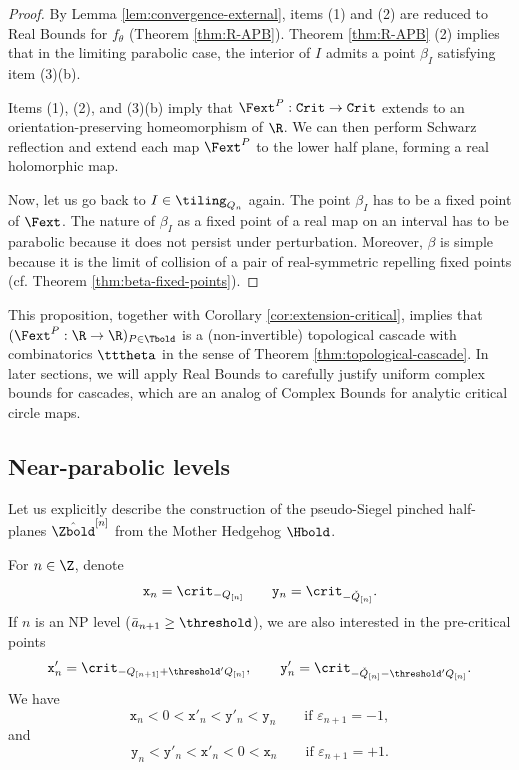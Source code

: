 \documentclass{amsart}
\begin{document}
\begin{proof}
    By Lemma \ref{lem:convergence-external}, items (1) and (2) are reduced to Real Bounds for $f_\theta$ (Theorem \ref{thm:R-APB}).
    Theorem \ref{thm:R-APB} (2) implies that in the limiting parabolic case, the interior of $I$ admits a point $\beta_I$ satisfying item (3)(b).
    
    Items (1), (2), and (3)(b) imply that $\Fext^{P}: \mathtt{Crit} \to \mathtt{Crit}$ extends to an orientation-preserving homeomorphism of $\R$. 
    We can then perform Schwarz reflection and extend each map $\Fext^P$ to the lower half plane, forming a real holomorphic map.
    
    Now, let us go back to $I \in \tiling_{Q_n}$ again. 
    The point $\beta_I$ has to be a fixed point of $\Fext$. 
    The nature of $\beta_I$ as a fixed point of a real map on an interval has to be parabolic because it does not persist under perturbation.
    Moreover, $\beta$ is simple because it is the limit of collision of a pair of real-symmetric repelling fixed points (cf. Theorem \ref{thm:beta-fixed-points}).
\end{proof}

This proposition, together with Corollary \ref{cor:extension-critical}, implies that $(\Fext^P : \R \to \R)_{P \in \Tbold}$ is a (non-invertible) topological cascade with combinatorics $\tttheta$ in the sense of Theorem \ref{thm:topological-cascade}.
In later sections, we will apply Real Bounds to carefully justify uniform complex bounds for cascades, which are an analog of Complex Bounds for analytic critical circle maps.

\subsection{Near-parabolic levels}
\label{ss:near-parabolic-levels}

Let us explicitly describe the construction of the pseudo-Siegel pinched half-planes $\hat{\Zbold}^{[n]}$ from the Mother Hedgehog $\Hbold$.

For $n \in \Z$, denote
\[
    \mathtt{x}_n = \crit_{-Q_{[n]}} \qquad \mathtt{y}_n = \crit_{-\check{Q}_{[n]}}.
\]
If $n$ is an NP level ($\bar{a}_{n+1} \geq \threshold$), we are also interested in the pre-critical points 
\[
    \mathtt{x}'_n = \crit_{-Q_{[n+1]} + \threshold' Q_{[n]}},\qquad
\mathtt{y}'_n = \crit_{-\check{Q}_{[n]} - \threshold' Q_{[n]}}.
\]
We have
\[
    \mathtt{x}_n < 0 < \mathtt{x}'_n < \mathtt{y}'_n < \mathtt{y}_n \qquad \text{if } \varepsilon_{n+1} = -1, 
\]
and
\[
    \mathtt{y}_n < \mathtt{y}'_n < \mathtt{x}'_n < 0 < \mathtt{x}_n  \qquad \text{if } \varepsilon_{n+1} = +1. 
\]
\end{document}
